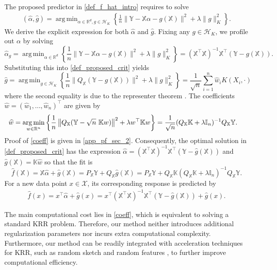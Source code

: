 \documentclass[11pt,twoside]{article}
\DeclareMathOperator*{\argmin}{arg\,min}
\def\KK{\mathbb{K}}
\def\II{\mathbb{I}}
\def\YY{\mathbb{Y}}
\def\XX{\mathbb{X}}
\def\RR{\mathbb{R}}
\def\cH{\mathcal H}
\def\cX{\mathcal{X}}
\def\wh{\widehat}
\def\T{\top}
\def\b{\big}
\begin{document}
The proposed predictor in \eqref{def_f_hat_intro} requires to solve  
\begin{align}\label{def_proposed_crit}
(\wh \alpha, \wh g) 
=\argmin_{\alpha\in \RR^d,  g\in \cH_K}  \left\{ \frac{1}{n} \|\YY -\XX \alpha - g(\XX)\|^2  +\lambda\|g\|_K ^2 \right\}.
\end{align}
We derive the explicit expression for both $\wh\alpha$ and $\wh g$. Fixing any $g \in \cH_K$, we profile out $\alpha$ by solving 
\[
\wh \alpha_g
=\argmin_{\alpha\in \RR^d}  \left\{ \frac{1}{n} \|\YY -  \XX\alpha - g(\XX)\|^2 
+\lambda\|g\|_{K}^2 \right\}  = (\XX^\T\XX)^{-1}\XX^\T (\YY - g(\XX)).
\]
Substituting this into 
\eqref{def_proposed_crit} yields
\[
\wh g
=\argmin_{ g\in \cH_K}  \left\{  \frac{1}{n}  \b\|Q_{\XX}(\YY -g(\XX) )\b\|^2
+\lambda\|g\|_{K}^2 \right\} = \frac{1}{\sqrt{n}}\sum_{i=1}^n \wh w_i K(X_i,\cdot)
\]
where the second equality is due to the representer theorem \citep{kimeldorf1971some}. The coefficients $\wh w = (\wh w_1,\ldots, \wh w_n)^\T$ are given by 
\begin{align}\label{coeff}
    \wh w & = \argmin_{w \in \RR^n}  \left \{
    {1\over n}\left\| Q_{\XX} (\YY - \sqrt{n} ~ \KK w ) \right\|^2
    +\lambda   w^\T \KK w \right \} = {1\over \sqrt n}(Q_{\XX} \KK+\lambda \II_n)^{-1}Q_{\XX} \YY.
\end{align}
Proof of \eqref{coeff} is given in  \cref{app_pf_sec_2}. 
Consequently, the optimal solution in \eqref{def_proposed_crit} has the expression 
$
    \wh \alpha =(\XX^\T\XX)^{-1}\XX^\T (\YY -  \wh g(\XX)) 
$
and 
$ \wh g(\XX) = \KK \wh w$ 
so that the fit is 
\begin{equation}\label{fit}
    \wh f(\XX) = \XX \wh \alpha + \wh g(\XX) =  P_{\XX}\YY + Q_{\XX}\wh g(\XX) = P_{\XX}\YY +  Q_{\XX}\KK(Q_{\XX} \KK+\lambda \II_n )^{-1}Q_{\XX} \YY.
\end{equation}
 For a new data point $x\in \cX$,  its corresponding response is predicted by
\begin{align} \label{proposed_m}
    \wh f(x) = x^\T\wh \alpha +   \wh g (x) = x^\T  (\XX^\T \XX)^{-1}  \XX ^\T( \YY -    \wh g (\XX) ) +   \wh g (x).
\end{align}


The main computational cost lies in \eqref{coeff}, which is equivalent to solving a standard KRR problem. Therefore, our method neither introduces additional regularization parameters nor incurs extra computational complexity.
Furthermore, our method can be readily integrated with acceleration techniques for KRR, such as random sketch \citep{alaoui2015fast} and random features \citep{rahimi2007random}, to further improve computational efficiency.
\end{document}
